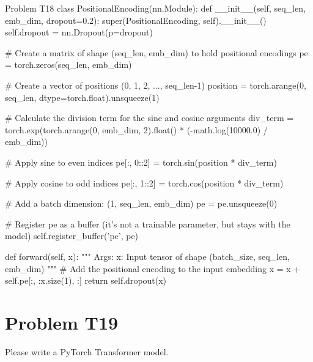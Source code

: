 \documentclass[12pt, a4paper]{article}
\begin{document}
            \begin{codeblock}{Problem T18}
                class PositionalEncoding(nn.Module):
                    def __init__(self, seq_len, emb_dim, dropout=0.2):
                        super(PositionalEncoding, self).__init__()
                        self.dropout = nn.Dropout(p=dropout)

                        # Create a matrix of shape (seq_len, emb_dim) to hold positional encodings
                        pe = torch.zeros(seq_len, emb_dim)
                        
                        # Create a vector of positions (0, 1, 2, ..., seq_len-1)
                        position = torch.arange(0, seq_len, dtype=torch.float).unsqueeze(1)
                        
                        # Calculate the division term for the sine and cosine arguments
                        div_term = torch.exp(torch.arange(0, emb_dim, 2).float() * (-math.log(10000.0) / emb_dim))
                        
                        # Apply sine to even indices
                        pe[:, 0::2] = torch.sin(position * div_term)
                        
                        # Apply cosine to odd indices
                        pe[:, 1::2] = torch.cos(position * div_term)
                        
                        # Add a batch dimension: (1, seq_len, emb_dim)
                        pe = pe.unsqueeze(0)
                        
                        # Register pe as a buffer (it's not a trainable parameter, but stays with the model)
                        self.register_buffer('pe', pe)

                    def forward(self, x):
                        """
                        Args:
                            x: Input tensor of shape (batch_size, seq_len, emb_dim)
                        """
                        # Add the positional encoding to the input embedding
                        x = x + self.pe[:, :x.size(1), :]
                        return self.dropout(x)
            \end{codeblock}

    \pagebreak

        \section{Problem T19}
            Please write a PyTorch Transformer model.
\end{document}
